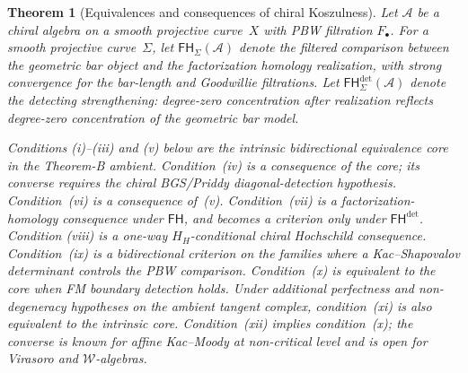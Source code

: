 \documentclass[11pt,reqno]{amsart}
\newtheorem{theorem}{Theorem}[section]
\theoremstyle{definition}
\theoremstyle{remark}
\newcommand{\cA}{\mathcal{A}}
\newcommand{\cW}{\mathcal{W}}
\numberwithin{equation}{section}
\begin{document}
\begin{theorem}[Equivalences and consequences of chiral Koszulness]
\label{thm:koszul-equivalences-meta}
Let $\cA$ be a chiral algebra on a smooth projective curve~$X$
with PBW filtration $F_\bullet$.
For a smooth projective curve~$\Sigma$, let
$\mathsf{FH}_{\Sigma}(\cA)$ denote the filtered comparison
between the geometric bar object and the factorization homology
realization, with strong convergence for the bar-length and
Goodwillie filtrations. Let
$\mathsf{FH}^{\mathrm{det}}_{\Sigma}(\cA)$ denote the detecting
strengthening: degree-zero concentration after realization reflects
degree-zero concentration of the geometric bar model.

Conditions \textup{(i)--(iii)} and \textup{(v)} below are the
intrinsic bidirectional equivalence core in the Theorem-B ambient.
Condition~\textup{(iv)} is a consequence of the core; its converse
requires the chiral BGS/Priddy diagonal-detection hypothesis.
Condition~\textup{(vi)} is a consequence of~\textup{(v)}.
Condition~\textup{(vii)} is a factorization-homology consequence
under $\mathsf{FH}$, and becomes a criterion only under
$\mathsf{FH}^{\mathrm{det}}$. Condition \textup{(viii)} is a
one-way $H_H$-conditional chiral Hochschild consequence.
Condition~\textup{(ix)} is a bidirectional criterion on the
families where a Kac--Shapovalov determinant controls the PBW
comparison. Condition~\textup{(x)} is equivalent to the core when
FM boundary detection holds. Under additional perfectness and
non-degeneracy hypotheses on the ambient tangent complex,
condition~\textup{(xi)} is also equivalent to the intrinsic core.
Condition~\textup{(xii)} implies condition~\textup{(x)}; the
converse is known for affine Kac--Moody at non-critical level and
is open for Virasoro and $\cW$-algebras.


\end{theorem}
\end{document}
